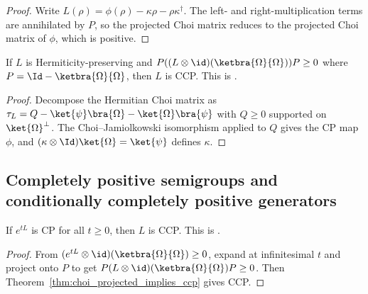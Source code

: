 \begin{proof}
    \leanok
    Write $L(\rho) = \phi(\rho) - \kappa\rho - \rho\kappa^\dagger$.
    The left- and right-multiplication terms are annihilated by $P$, so the
    projected Choi matrix reduces to the projected Choi matrix of $\phi$, which
    is positive.
\end{proof}

\begin{theorem}
    \label{thm:choi_projected_implies_ccp}
    \leanok
    If $L$ is Hermiticity-preserving and
    $P((L \otimes \id)(\ketbra{\Omega}{\Omega}))P \ge 0$
    where $P = \Id - \ketbra{\Omega}{\Omega}$,
    then $L$ is CCP.
    This is \cite[Proposition~7.2]{Wolf2012Quantum}.
\end{theorem}

\begin{proof}
    \leanok
    Decompose the Hermitian Choi matrix as
    $\tau_L = Q - \ket{\psi}\bra{\Omega} - \ket{\Omega}\bra{\psi}$
    with $Q \ge 0$ supported on $\ket{\Omega}^\perp$.
    The Choi--Jamiolkowski isomorphism applied to $Q$ gives
    the CP map $\phi$, and
    $(\kappa \otimes \Id)\ket{\Omega} = \ket{\psi}$ defines $\kappa$.
\end{proof}

\subsection{Completely positive semigroups and conditionally completely positive generators}

\begin{theorem}
    \label{thm:cp_semigroup_implies_ccp}
    \leanok
    If $e^{tL}$ is CP for all $t \ge 0$, then $L$ is CCP.
    This is \cite[Proposition~7.3]{Wolf2012Quantum}.
\end{theorem}

\begin{proof}
    \leanok
    From $(e^{tL} \otimes \id)(\ketbra{\Omega}{\Omega}) \ge 0$,
    expand at infinitesimal $t$ and project onto $P$ to get
    $P(L\otimes\id)(\ketbra{\Omega}{\Omega})P \ge 0$.
    Then Theorem~\ref{thm:choi_projected_implies_ccp} gives CCP.
\end{proof}

